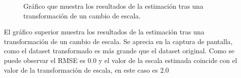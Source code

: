 \begin{figure}
\begin{center}
\hspace{0.5cm}

\end{center}

\caption{Gráfico que muestra los resultados de la estimación tras una transformación de un cambio de escala.}
\end{figure}

El gráfico superior muestra los resultados de la estimación tras una transformación de un cambio de escala. Se aprecia en la captura de pantalla, como el dataset transformado es más grande que el dataset original. Como se puede observar el RMSE es 0.0 y el valor de la escala estimada coincide con el valor de la transformación de escala, en este caso es 2.0

